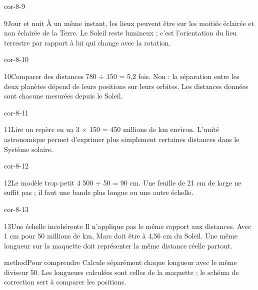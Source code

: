 \documentclass[12pt,twoside,openany]{book}
\begin{document}
\begin{blocLivre}{cor-8-9}
\begin{corrige}{9}{Jour et nuit}
À un même instant, les lieux peuvent être sur les moitiés éclairée et non éclairée de la Terre. Le Soleil reste lumineux ; c’est l’orientation du lieu terrestre par rapport à lui qui change avec la rotation.\par
{}
\end{corrige}\end{blocLivre}
\begin{blocLivre}{cor-8-10}
\begin{corrige}{10}{Comparer des distances}
780 \(\div\) 150 = 5,2 fois. Non : la séparation entre les deux planètes dépend de leurs positions sur leurs orbites. Les distances données sont chacune mesurées depuis le Soleil.\par
\end{corrige}\end{blocLivre}
\begin{blocLivre}{cor-8-11}
\begin{corrige}{11}{Lire un repère en ua}
3 \(\times\) 150 = 450 millions de km environ. L’unité astronomique permet d’exprimer plus simplement certaines distances dans le Système solaire.\par
\end{corrige}\end{blocLivre}
\begin{blocLivre}{cor-8-12}
\begin{corrige}{12}{Le modèle trop petit}
4 500 \(\div\) 50 = 90 cm. Une feuille de 21 cm de large ne suffit pas ; il faut une bande plus longue ou une autre échelle.\par
\end{corrige}\end{blocLivre}
\begin{blocLivre}{cor-8-13}
\begin{corrige}{13}{Une échelle incohérente}
Il n’applique pas le même rapport aux distances. Avec 1 cm pour 50 millions de km, Mars doit être à 4,56 cm du Soleil. Une même longueur sur la maquette doit représenter la même distance réelle partout.\par
\begin{pcEncadre}{method}{Pour comprendre}
Calcule séparément chaque longueur avec le même diviseur 50. Les longueurs calculées sont celles de la maquette ; le schéma de correction sert à comparer les positions.\par
\end{pcEncadre}
\end{corrige}\end{blocLivre}
\end{document}

